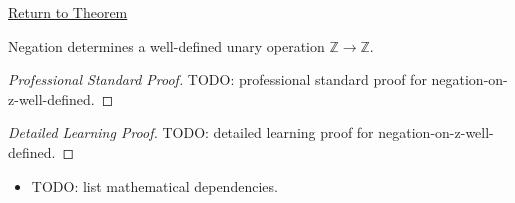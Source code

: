 \newpage
{}
\label{prf:negation-on-z-well-defined}

\begin{remark*}[Return]
\hyperref[thm:negation-on-z-well-defined]{Return to Theorem}
\end{remark*}

\begin{theorem*}
Negation determines a well-defined unary operation $\mathbb{Z}\to\mathbb{Z}$.
\end{theorem*}

\begin{proof}[Professional Standard Proof]
\LRAProofBodyStart
TODO: professional standard proof for negation-on-z-well-defined.
\end{proof}

\begin{proof}[Detailed Learning Proof]
\LRAProofBodyStart
TODO: detailed learning proof for negation-on-z-well-defined.
\end{proof}

\begin{remark*}
\end{remark*}

\begin{dependencies}
\begin{itemize}
  \item TODO: list mathematical dependencies.
\end{itemize}
\end{dependencies}

\clearpage
